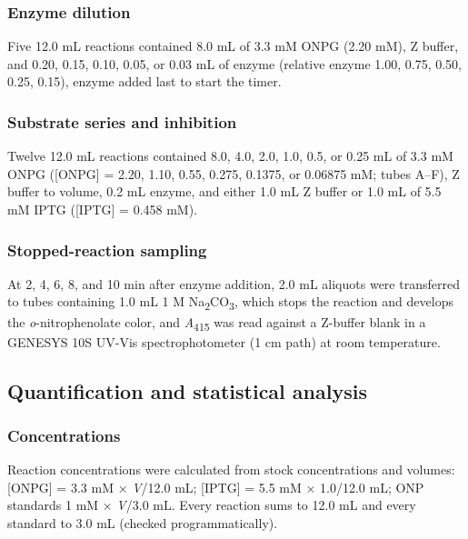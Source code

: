\documentclass[9pt,twocolumn]{extarticle}
\newcommand{\Aa}{\textit{A}\textsubscript{415}}
\newcommand{\dash}{–}
\begin{document}
\subsubsection{Enzyme dilution}
Five 12.0 mL reactions contained 8.0 mL of 3.3 mM ONPG (2.20 mM), Z buffer, and 0.20, 0.15, 0.10, 0.05, or 0.03 mL of enzyme (relative enzyme 1.00, 0.75, 0.50, 0.25, 0.15), enzyme added last to start the timer.
\subsubsection{Substrate series and inhibition}
Twelve 12.0 mL reactions contained 8.0, 4.0, 2.0, 1.0, 0.5, or 0.25 mL of 3.3 mM ONPG ([ONPG] = 2.20, 1.10, 0.55, 0.275, 0.1375, or 0.06875 mM; tubes A\dash F), Z buffer to volume, 0.2 mL enzyme, and either 1.0 mL Z buffer or 1.0 mL of 5.5 mM IPTG ([IPTG] = 0.458 mM).
\subsubsection{Stopped-reaction sampling}
At 2, 4, 6, 8, and 10 min after enzyme addition, 2.0 mL aliquots were transferred to tubes containing 1.0 mL 1 M Na\textsubscript{2}CO\textsubscript{3}, which stops the reaction and develops the \textit{o}-nitrophenolate color, and \Aa{} was read against a Z-buffer blank in a GENESYS 10S UV-Vis spectrophotometer (1 cm path) at room temperature.

\subsection{Quantification and statistical analysis}
\subsubsection{Concentrations}
Reaction concentrations were calculated from stock concentrations and volumes: [ONPG] = 3.3 mM × \textit{V}/12.0 mL; [IPTG] = 5.5 mM × 1.0/12.0 mL; ONP standards 1 mM × \textit{V}/3.0 mL. Every reaction sums to 12.0 mL and every standard to 3.0 mL (checked programmatically).
\end{document}
